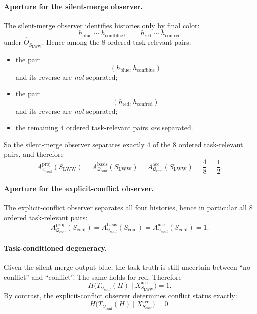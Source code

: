 \documentclass[11pt,twoside]{article}
\theoremstyle{definition}
\newcommand{\proj}{\mathrm{proj}}
\newcommand{\basis}{\mathrm{basis}}
\newcommand{\acc}{\mathrm{acc}}
\newcommand{\blue}{\mathrm{blue}}
\newcommand{\red}{\mathrm{red}}
\newcommand{\conf}{\mathrm{conf}}
\begin{document}
\paragraph{Aperture for the silent-merge observer.}
The silent-merge observer identifies histories only by final color:
\[
  h_{\blue}\sim h_{\conf\blue},
  \qquad
  h_{\red}\sim h_{\conf\red}
\]
under \(\widehat{O}_{S_{\mathrm{LWW}}}\).
Hence among the \(8\) ordered task-relevant pairs:
\begin{itemize}[leftmargin=*]
  \item the pair
        \[
          (h_{\blue},h_{\conf\blue})
        \]
        and its reverse are \emph{not} separated;
  \item the pair
        \[
          (h_{\red},h_{\conf\red})
        \]
        and its reverse are \emph{not} separated;
  \item the remaining \(4\) ordered task-relevant pairs \emph{are} separated.
\end{itemize}
So the silent-merge observer separates exactly \(4\) of the \(8\) ordered task-relevant pairs, and therefore
\[
  A^{\proj}_{\mathcal{Q}_{\mathrm{conf}}}(S_{\mathrm{LWW}})
  =
  A^{\basis}_{\mathcal{Q}_{\mathrm{conf}}}(S_{\mathrm{LWW}})
  =
  A^{\acc}_{\mathcal{Q}_{\mathrm{conf}}}(S_{\mathrm{LWW}})
  =
  \frac{4}{8}
  =
  \frac12.
\]

\paragraph{Aperture for the explicit-conflict observer.}
The explicit-conflict observer separates all four histories, hence in particular all \(8\) ordered task-relevant pairs:
\[
  A^{\proj}_{\mathcal{Q}_{\mathrm{conf}}}(S_{\mathrm{conf}})
  =
  A^{\basis}_{\mathcal{Q}_{\mathrm{conf}}}(S_{\mathrm{conf}})
  =
  A^{\acc}_{\mathcal{Q}_{\mathrm{conf}}}(S_{\mathrm{conf}})
  =
  1.
\]

\paragraph{Task-conditioned degeneracy.}
Given the silent-merge output \(\blue\), the task truth is still uncertain between ``no conflict'' and ``conflict''. The same holds for \(\red\). Therefore
\[
  H\!\bigl(T_{\mathcal{Q}_{\mathrm{conf}}}(H)\mid X_{S_{\mathrm{LWW}}}^{\acc}\bigr)
  = 1.
\]
By contrast, the explicit-conflict observer determines conflict status exactly:
\[
  H\!\bigl(T_{\mathcal{Q}_{\mathrm{conf}}}(H)\mid X_{S_{\mathrm{conf}}}^{\acc}\bigr)
  = 0.
\]
\end{document}
